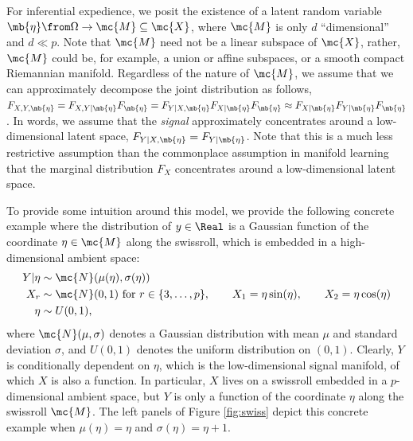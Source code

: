 For inferential expedience, we  posit the existence of  a latent random variable $\mb{\eta} \from \Omega \to \mc{M} \subseteq \mc{X}$, where $\mc{M}$ is only $d$ ``dimensional'' and $d \ll p$.   
Note that $\mc{M}$ need not be a linear subspace of $\mc{X}$, rather, $\mc{M}$ could be, for example,  a union or affine subspaces, or a smooth compact Riemannian manifold.  Regardless of the nature of $\mc{M}$, we assume that we can approximately decompose the joint distribution as follows,  $F_{X,Y,\mb{\eta}}=F_{X,Y|\mb{\eta}}F_{\mb{\eta}} = F_{Y|X, \mb{\eta}} F_{X | \mb{\eta}} F_{\mb{\eta}} \approx F_{X|\mb{\eta}} F_{Y|\mb{\eta}} F_{\mb{\eta}}$.  In  words, we assume that the \emph{signal} approximately concentrates around a low-dimensional latent space, $F_{Y|X,\mb{\eta}}=F_{Y|\mb{\eta}}$.  Note that this is a much less restrictive assumption than the commonplace assumption in manifold learning that the marginal distribution $F_X$ concentrates around a low-dimensional latent space. 

To provide some intuition around this model, we provide the following concrete example where the distribution of $y \in \Real$ is a Gaussian function of the coordinate $\eta \in \mc{M}$ along the swissroll, which is embedded in a high-dimensional ambient space:
\begin{subequations} \label{eq:linear}
\begin{align}
	Y | \eta &\sim \mc{N}(\mu(\eta) ,\sigma(\eta)) \\
X_r &\sim \mc{N}(0,1) \text{ for } r \in \{3, \ldots, p\}, \qquad 	X_1 = \eta \sin (\eta), \qquad X_2 = \eta \cos (\eta) \\
	\eta  &\sim U(0,1), 
\end{align}
\end{subequations}
where $\mc{N}(\mu,\sigma)$ denotes a Gaussian distribution with mean $\mu$ and standard deviation $\sigma$, and $U(0,1)$ denotes the uniform distribution on $(0,1)$.
Clearly, $Y$ is conditionally dependent on ${\eta}$, which is the low-dimensional signal manifold, of which $X$ is also a function.  In particular, $X$ lives on a swissroll embedded in a $p$-dimensional ambient space, but $Y$ is only a function of the coordinate ${\eta}$ along the swissroll $\mc{M}$. The left panels of Figure \ref{fig:swiss} depict this concrete example when $\mu(\eta)=\eta$ and $\sigma(\eta)=\eta + 1$.


